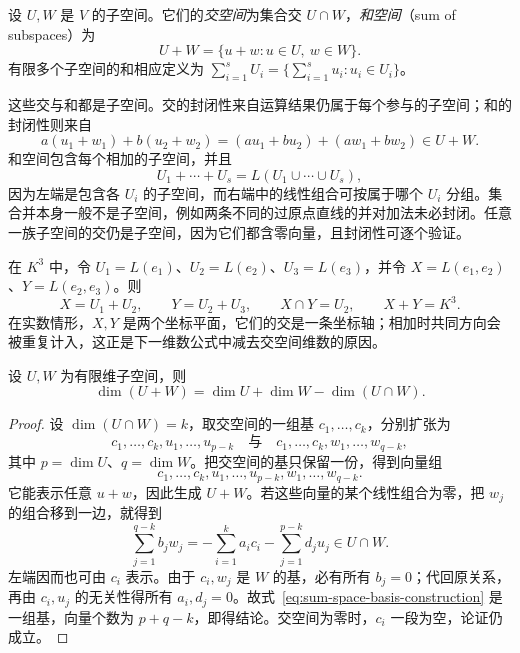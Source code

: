 \begin{definition}
\label{def:subspace-intersection-sum}
设 $U,W$ 是 $V$ 的子空间。它们的\emph{交空间}为集合交 $U\cap W$，\emph{和空间}（sum of subspaces）为
\[
    U+W=\{u+w:u\in U,\ w\in W\}.
\]
有限多个子空间的和相应定义为 $\sum_{i=1}^sU_i=\{\sum_{i=1}^su_i:u_i\in U_i\}$。
\end{definition}

这些交与和都是子空间。交的封闭性来自运算结果仍属于每个参与的子空间；和的封闭性则来自
\[
    a(u_1+w_1)+b(u_2+w_2)
    =(au_1+bu_2)+(aw_1+bw_2)\in U+W.
\]
和空间包含每个相加的子空间，并且
\begin{equation}
\label{eq:sum-span-union}
    U_1+\cdots+U_s=L(U_1\cup\cdots\cup U_s),
\end{equation}
因为左端是包含各 $U_i$ 的子空间，而右端中的线性组合可按属于哪个 $U_i$ 分组。集合并本身一般不是子空间，例如两条不同的过原点直线的并对加法未必封闭。任意一族子空间的交仍是子空间，因为它们都含零向量，且封闭性可逐个验证。

\begin{example}
\label{ex:coordinate-subspaces}
在 $K^3$ 中，令 $U_1=L(e_1)$、$U_2=L(e_2)$、$U_3=L(e_3)$，并令 $X=L(e_1,e_2)$、$Y=L(e_2,e_3)$。则
\[
    X=U_1+U_2,\qquad Y=U_2+U_3,\qquad
    X\cap Y=U_2,\qquad X+Y=K^3.
\]
在实数情形，$X,Y$ 是两个坐标平面，它们的交是一条坐标轴；相加时共同方向会被重复计入，这正是下一维数公式中减去交空间维数的原因。
\end{example}

\begin{theorem}[维数公式]
\label{thm:subspace-dimension-formula}
设 $U,W$ 为有限维子空间，则
\begin{equation}
\label{eq:subspace-dimension-formula}
    \dim(U+W)=\dim U+\dim W-\dim(U\cap W).
\end{equation}
\end{theorem}

\begin{proof}
设 $\dim(U\cap W)=k$，取交空间的一组基 $c_1,\ldots,c_k$，分别扩张为
\[
    c_1,\ldots,c_k,u_1,\ldots,u_{p-k}\quad\text{与}\quad
    c_1,\ldots,c_k,w_1,\ldots,w_{q-k},
\]
其中 $p=\dim U$、$q=\dim W$。把交空间的基只保留一份，得到向量组
\begin{equation}
\label{eq:sum-space-basis-construction}
    c_1,\ldots,c_k,u_1,\ldots,u_{p-k},w_1,\ldots,w_{q-k}.
\end{equation}
它能表示任意 $u+w$，因此生成 $U+W$。若这些向量的某个线性组合为零，把 $w_j$ 的组合移到一边，就得到
\[
    \sum_{j=1}^{q-k}b_jw_j
    =-\sum_{i=1}^ka_ic_i-\sum_{j=1}^{p-k}d_ju_j\in U\cap W.
\]
左端因而也可由 $c_i$ 表示。由于 $c_i,w_j$ 是 $W$ 的基，必有所有 $b_j=0$；代回原关系，再由 $c_i,u_j$ 的无关性得所有 $a_i,d_j=0$。故式~\eqref{eq:sum-space-basis-construction} 是一组基，向量个数为 $p+q-k$，即得结论。交空间为零时，$c_i$ 一段为空，论证仍成立。
\end{proof}

